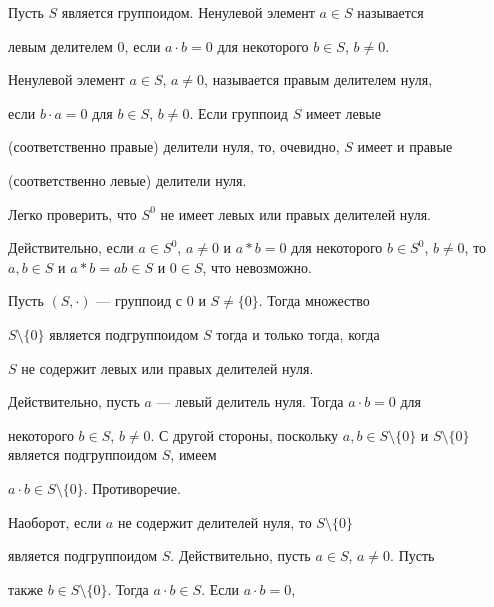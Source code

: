  


Пусть $S$ является группоидом. Ненулевой элемент $a\in S$ называется 


левым делителем $0$, если $a\cdot b=0$ для некоторого $b\in S$, $b\ne0$. 


Ненулевой элемент $a\in S$, $a\ne0$, называется правым делителем нуля, 


если $b\cdot a=0$ для $b\in S$, $b\ne0$. Если группоид $S$ имеет левые 


(соответственно правые) делители нуля, то, очевидно, $S$ имеет и правые 


(соответственно левые) делители нуля. 


 


Легко проверить, что $S^0$ не имеет левых или правых делителей нуля. 


Действительно, если $a\in S^0$, $a\ne0$ и $a*b=0$ для некоторого $b\in 


S^0$, $b\ne0$, то $a,b\in S$ и $a*b=ab\in S$ и $0\in S$, что невозможно. 


 


\begin{note} 


Пусть $(S,\cdot)$ --- группоид с 0 и $S\ne\{0\}$. Тогда множество 


$S\setminus\{0\}$ является подгруппоидом $S$ тогда и только тогда, когда 


$S$ не содержит левых или правых делителей нуля. 


\end{note} 


 


Действительно, пусть $a$ --- левый делитель нуля. Тогда $a\cdot b=0$ для 


некоторого $b\in S$, $b\ne0$. С другой стороны, поскольку $a,b\in 


S\setminus\{0\}$ и $S\setminus\{0\}$ является подгруппоидом $S$, имеем 


$a\cdot b\in S\setminus\{0\}$. Противоречие. 


 


Наоборот, если $a$ не содержит делителей нуля, то $S\setminus\{0\}$ 


является подгруппоидом $S$. Действительно, пусть $a\in S$, $a\ne0$. Пусть 


также $b\in S\setminus\{0\}$. Тогда $a\cdot b\in S$. Если $a\cdot b=0$, 


